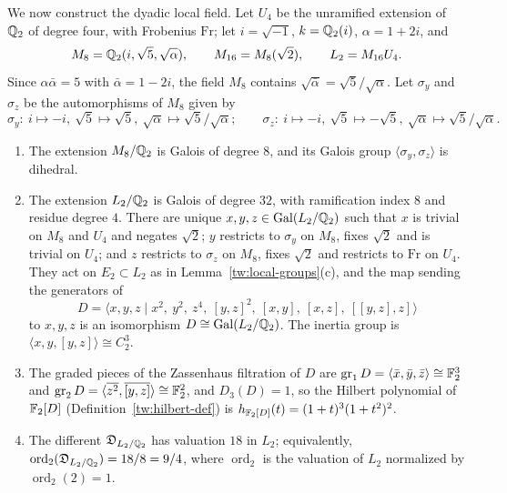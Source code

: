 We now construct the dyadic local field. Let $U_4$ be the
unramified extension of $\mathbb Q_2$ of degree four, with Frobenius $\mathrm{Fr}$;
let $i=\sqrt{-1}$, $k=\mathbb Q_2(i)$, $\alpha=1+2i$, and
\[
 M_8=\mathbb Q_2(i,\sqrt5,\sqrt\alpha),\qquad M_{16}=M_8(\sqrt2),\qquad
 L_2=M_{16}U_4 .
\]
Since $\alpha\bar\alpha=5$ with $\bar\alpha=1-2i$, the field $M_8$ contains
$\sqrt{\bar\alpha}=\sqrt5/\sqrt\alpha$. Let $\sigma_y$ and $\sigma_z$ be the
automorphisms of $M_8$ given by
\[
 \sigma_y:\ i\mapsto-i,\ \sqrt5\mapsto\sqrt5,\ \sqrt\alpha\mapsto\sqrt5/\sqrt\alpha;
 \qquad
 \sigma_z:\ i\mapsto-i,\ \sqrt5\mapsto-\sqrt5,\ \sqrt\alpha\mapsto\sqrt5/\sqrt\alpha.
\]

\begin{lemma}\label{tw:local-two}
\begin{enumerate}
\item[(a)] The extension $M_8/\mathbb Q_2$ is Galois of degree $8$, and its Galois
 group $\langle\sigma_y,\sigma_z\rangle$ is dihedral.
\item[(b)] The extension $L_2/\mathbb Q_2$ is Galois of degree $32$, with
 ramification index $8$ and residue degree $4$. There are unique
 $x,y,z\in\operatorname{Gal}(L_2/\mathbb Q_2)$ such that $x$ is trivial on $M_8$ and $U_4$ and
 negates $\sqrt2$; $y$ restricts to $\sigma_y$ on $M_8$, fixes $\sqrt2$ and
 is trivial on $U_4$; and $z$ restricts to $\sigma_z$ on $M_8$, fixes $\sqrt2$
 and restricts to $\mathrm{Fr}$ on $U_4$. They act on $E_2\subset L_2$ as in
 Lemma~\ref{tw:local-groups}(c), and the map sending the generators of
 \[
  D=\langle x,y,z\mid x^2,\ y^2,\ z^4,\ [y,z]^2,\ [x,y],\ [x,z],\ [[y,z],z]\rangle
 \]
 to $x,y,z$ is an isomorphism $D\cong\operatorname{Gal}(L_2/\mathbb Q_2)$. The inertia group is
 $\langle x,y,[y,z]\rangle\cong C_2^3$.
\item[(c)] The graded pieces of the Zassenhaus filtration of $D$ are
 $\operatorname{gr}_1D=\langle\bar x,\bar y,\bar z\rangle\cong\mathbb F_2^3$ and
 $\operatorname{gr}_2D=\langle\overline{z^2},\overline{[y,z]}\rangle\cong\mathbb F_2^2$,
 and $D_3(D)=1$, so the Hilbert polynomial of $\mathbb F_2[D]$
 (Definition~\ref{tw:hilbert-def}) is $h_{\mathbb F_2[D]}(t)=(1+t)^3(1+t^2)^2$.
\item[(d)] The different $\mathfrak D_{L_2/\mathbb Q_2}$ has valuation $18$ in $L_2$;
 equivalently, $\operatorname{ord}_2(\mathfrak D_{L_2/\mathbb Q_2})=18/8=9/4$, where
 $\operatorname{ord}_2$ is the valuation of $L_2$ normalized by
 $\operatorname{ord}_2(2)=1$.
\end{enumerate}
\end{lemma}

